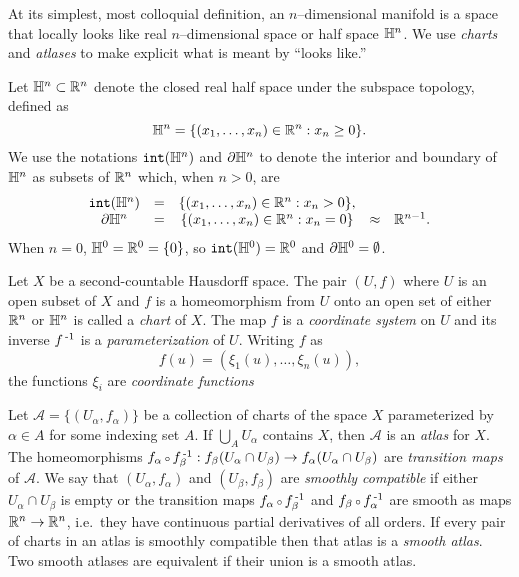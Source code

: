 At its simplest, most colloquial definition, an $n$--dimensional manifold is a space that locally looks like real $n$--dimensional space or half space $\mathbb{H}^n$.
We use \emph{charts} and \emph{atlases} to make explicit what is meant by ``looks like.''

\begin{defn}[Coordinates]
	\label{def:coordinates}
	Let $\mathbb{H}^n\subset\mathbb{R}^n$ denote the closed real half space under the subspace topology, defined as
	\[
		\mathbb{H}^n=\{(x_1,\dots,x_{n})\in\mathbb{R}^n : x_n\geq 0\}.
	\]
	We use the notations $\mathtt{int}(\mathbb{H}^n)$ and $\partial \mathbb{H}^n$ to denote the interior and boundary of $\mathbb{H}^n$ as subsets of $\mathbb{R}^n$ which, when $n>0$, are
	\[
		\begin{array}{ccccc}
			\mathtt{int}(\mathbb{H}^n) & = & \{(x_1,\dots,x_{n})\in\mathbb{R}^n : x_n > 0\}, & &\\
			\partial \mathbb{H}^n	& = & \{(x_1,\dots,x_{n})\in\mathbb{R}^n : x_n = 0\} & \approx & \mathbb{R}^{n-1}.
		\end{array}
	\]
	When $n=0$, $\mathbb{H}^0 = \mathbb{R}^0 = \{0\}$, so $\mathtt{int}(\mathbb{H}^0)=\mathbb{R}^0$ and $\partial\mathbb{H}^0=\emptyset$.

	Let $X$ be a second-countable Hausdorff space.
	The pair $(U,f)$ where $U$ is an open subset of $X$ and $f$ is a homeomorphism from $U$ onto an open set of either $\mathbb{R}^n$ or $\mathbb{H}^n$ is called a \emph{chart} of $X$.
	The map $f$ is a \emph{coordinate system} on $U$ and its inverse $f^{\,\text{-}1}$ is a \emph{parameterization} of $U$.
	Writing $f$ as
	\[
		f(u) = (\xi_1(u),\dots,\xi_n(u)),
	\]
	the functions $\xi_i$ are \emph{coordinate functions}
\end{defn}

\begin{defn}[Atlas]
	\label{def:atlas}
	Let $\mathcal{A}=\{(U_\alpha,f_\alpha)\}$ be a collection of charts of the space $X$ parameterized by $\alpha\in A$ for some indexing set $A$.
	If $\bigcup_A U_\alpha$ contains $X$, then $\mathcal{A}$ is an \emph{atlas} for $X$.
	The homeomorphisms $f_\alpha\comp f_\beta\inv:f_\beta(U_\alpha\cap U_\beta)\to f_\alpha(U_\alpha\cap U_\beta)$ are \emph{transition maps} of $\mathcal{A}$.
	We say that $(U_\alpha,f_\alpha)$ and $(U_\beta,f_\beta)$ are \emph{smoothly compatible} if either $U_\alpha\cap U_\beta$ is empty or the transition maps $f_\alpha\comp f_\beta\inv$ and $f_\beta\comp f_\alpha\inv$ are smooth as maps $\mathbb{R}^n\to\mathbb{R}^n$, i.e.\ they have continuous partial derivatives of all orders.
	If every pair of charts in an atlas is smoothly compatible then that atlas is a \emph{smooth atlas}.
	Two smooth atlases are equivalent if their union is a smooth atlas.
\end{defn}

